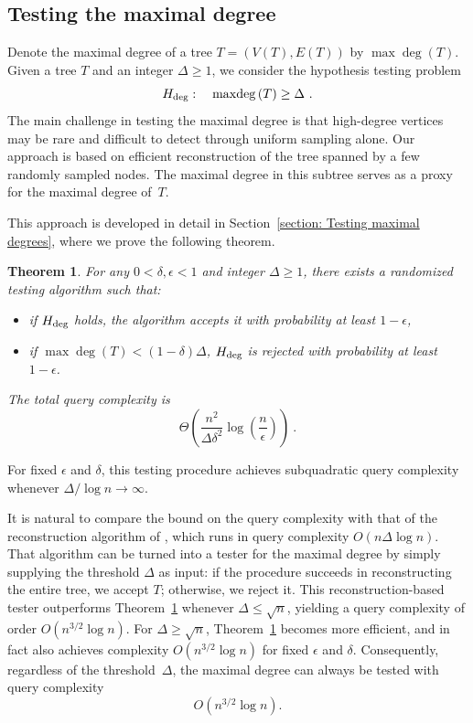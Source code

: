 \documentclass[12pt]{article}
\newtheorem{theorem}{Theorem}[section]
\newcommand{\maxdeg}[1]{\max\!\deg\left(#1\right)}
\begin{document}
\subsection{Testing the maximal degree}

Denote the maximal degree of a tree \(T=(V(T),E(T))\) by
$\maxdeg{T}$. Given a tree $T$ and an integer $\Delta \ge 1$, we consider the hypothesis testing problem
\[
H_{\rm deg}: \quad \maxdeg{T} \ge \Delta~.
\]
The main challenge in testing the maximal degree is that high-degree vertices may be rare and difficult to detect through uniform sampling alone.
Our approach is based on efficient reconstruction of the tree spanned by a few randomly sampled nodes. The maximal degree in this subtree serves as a proxy for the maximal degree of~$T$.

This approach is developed in detail in Section~\ref{section: Testing maximal degrees}, where we prove the following theorem.

\begin{theorem}\label{thm: max degree test}
For any $0<\delta,\epsilon<1$ and integer $\Delta \ge 1$, there exists a randomized testing algorithm such that:
\begin{itemize}
    \item [(i)] if $H_{\rm deg}$ holds, the algorithm accepts it with probability at least $1-\epsilon$,
    \item [(ii)] if $\maxdeg{T} < (1-\delta)\Delta$, $H_{\rm deg}$ is rejected with probability at least $1-\epsilon$.
\end{itemize}
The total query complexity is
\[
\Theta\!\left(
\frac{n^2}{\Delta\delta^2}
\log\!\left(\frac{n}{\epsilon}\right)
\right)~.
\]
\end{theorem}


\noindent
For fixed $\epsilon$ and $\delta$, this testing procedure achieves subquadratic query complexity whenever $\Delta/\log n \to \infty$.

It is natural to compare the bound on the query complexity with that of the reconstruction algorithm of \cite{DeLuZw24}, which runs in query complexity $O(n\Delta \log n)$. 
That algorithm can be turned into a tester for the maximal degree by simply supplying the threshold $\Delta$ as input: if the procedure succeeds in reconstructing the entire tree, we accept $T$; otherwise, we reject it. 
This reconstruction-based tester outperforms Theorem~\ref{thm: max degree test} whenever $\Delta \le \sqrt{n}$, yielding a query complexity of order $O(n^{3/2}\log n)$. 
For $\Delta \ge \sqrt{n}$, Theorem~\ref{thm: max degree test} becomes more efficient, and in fact also achieves complexity $O(n^{3/2}\log n)$ for fixed $\epsilon$ and $\delta$. 
Consequently, regardless of the threshold~$\Delta$, the maximal degree can always be tested with query complexity
\[
O\!\left(n^{3/2}\log n\right).
\]
\end{document}
